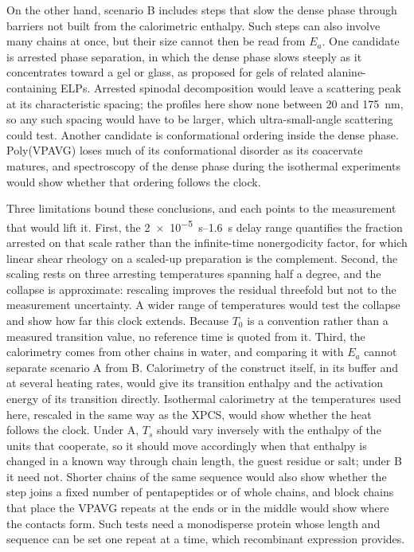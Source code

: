 \documentclass[journal=nalefd,manuscript=letter,layout=traditional]{achemso}
\begin{document}
On the other hand, scenario B includes steps that slow the dense phase through barriers not built from the calorimetric enthalpy. Such steps can also involve many chains at once, but their size cannot then be read from $E_a$. One candidate is arrested phase separation, in which the dense phase slows steeply as it concentrates toward a gel or glass, as proposed for gels of related alanine-containing ELPs.\cite{Glassman2015-cw} Arrested spinodal decomposition would leave a scattering peak at its characteristic spacing; the profiles here show none between 20 and \SI{175}{\nano\meter}, so any such spacing would have to be larger, which ultra-small-angle scattering could test. Another candidate is conformational ordering inside the dense phase. Poly(VPAVG) loses much of its conformational disorder as its coacervate matures,\cite{Amiram2011-la} and spectroscopy of the dense phase during the isothermal experiments would show whether that ordering follows the clock.

Three limitations bound these conclusions, and each points to the measurement that would lift it. First, the \SIrange{2e-5}{1.6}{\second} delay range quantifies the fraction arrested on that scale rather than the infinite-time nonergodicity factor, for which linear shear rheology on a scaled-up preparation is the complement. Second, the scaling rests on three arresting temperatures spanning half a degree, and the collapse is approximate: rescaling improves the residual threefold but not to the measurement uncertainty. A wider range of temperatures would test the collapse and show how far this clock extends. Because $T_0$ is a convention rather than a measured transition value, no reference time is quoted from it. Third, the calorimetry comes from other chains in water, and comparing it with $E_a$ cannot separate scenario A from B. Calorimetry of the construct itself, in its buffer and at several heating rates, would give its transition enthalpy and the activation energy of its transition directly. Isothermal calorimetry at the temperatures used here, rescaled in the same way as the XPCS, would show whether the heat follows the clock. Under A, $T_s$ should vary inversely with the enthalpy of the units that cooperate, so it should move accordingly when that enthalpy is changed in a known way through chain length, the guest residue or salt; under B it need not. Shorter chains of the same sequence would also show whether the step joins a fixed number of pentapeptides or of whole chains, and block chains that place the VPAVG repeats at the ends or in the middle would show where the contacts form. Such tests need a monodisperse protein whose length and sequence can be set one repeat at a time, which recombinant expression provides.
\end{document}
